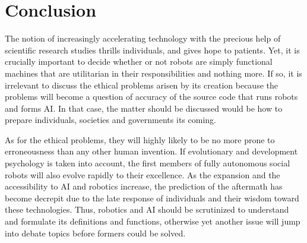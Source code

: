 \documentclass[man]{apa6}
\begin{document}
\section{Conclusion}
The notion of increasingly accelerating technology with the precious help of scientific research studies thrills individuals, and gives hope to patients.
Yet, it is crucially important to decide whether or not robots are simply functional machines that are utilitarian in their responsibilities and nothing more.
If so, it is irrelevant to discuss the ethical problems arisen by its creation because the problems will become a question of accuracy of the source code that runs robots and forms AI.
In that case, the matter should be discussed would be how to prepare individuals, societies and governments its coming. \par
As for the ethical problems, they will highly likely to be no more prone to erroneousness than any other human invention.
If evolutionary and development psychology is taken into account, the first members of fully autonomous social robots will also evolve rapidly to their excellence.
As the expansion and the accessibility to AI and robotics increase, the prediction of the aftermath has become decrepit due to the late response of individuals and their wisdom toward these technologies.
Thus, robotics and AI should be scrutinized to understand and formulate its definitions and functions, otherwise yet another issue will jump into debate topics before formers could be solved.


\end{document}
